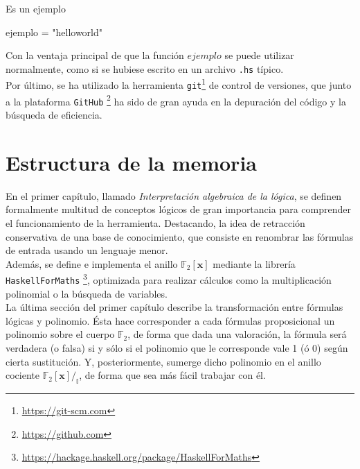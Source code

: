 Es un ejemplo
\begin{code}
ejemplo = "helloworld"
\end{code}

Con la ventaja principal de que la función $ejemplo$ se puede utilizar normalmente, como si se hubiese escrito en un archivo \texttt{.hs} típico.\\

Por último, se ha utilizado la herramienta \texttt{git}\footnote{\url{https://git-scm.com}} de control de versiones, que junto a la plataforma \texttt{GitHub} \footnote{\url{https://github.com}} ha sido de gran ayuda en la depuración del código y la búsqueda de eficiencia.


\section{Estructura de la memoria}


En el primer capítulo, llamado \textit{Interpretación algebraica de la lógica}, se definen formalmente multitud de conceptos lógicos de gran importancia para comprender el funcionamiento de la herramienta. Destacando, la idea de retracción conservativa de una base de conocimiento, que consiste en renombrar las fórmulas de entrada usando un lenguaje menor.\\ 

Además, se define e implementa el anillo $\mathbb{F}_2[\textbf{x}]$ mediante la librería \texttt{HaskellForMaths} \footnote{\url{https://hackage.haskell.org/package/HaskellForMaths}}, optimizada para realizar cálculos como la multiplicación polinomial o la búsqueda de variables.\\ 

La última sección del primer capítulo describe la transformación entre fórmulas lógicas y polinomio. Ésta hace corresponder a cada fórmulas proposicional un polinomio sobre el cuerpo $\mathbb{F}_2$, de forma que dada una valoración, la fórmula será verdadera (o falsa) si y sólo si el polinomio que le corresponde vale 1 (ó 0) según cierta sustitución. Y, posteriormente, sumerge dicho polinomio en el anillo cociente $\mathbb{F}_2[\textbf{x}] /_{\mathbb{I}}$, de forma que sea más fácil trabajar con él.\\

